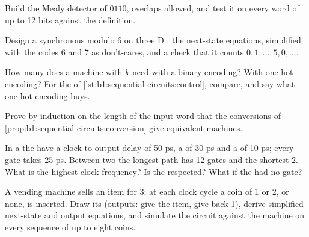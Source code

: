 \begin{exercise}[$\star\star$]\label{exo:b1:sequential-circuits:7}
Build the Mealy detector of $0110$, overlaps allowed, and test it on every word of up to 12 bits against the definition.
\end{exercise}

\begin{exercise}[$\star\star$]\label{exo:b1:sequential-circuits:8}
Design a synchronous  modulo 6 on three D : the next-state equations, simplified with the codes 6 and 7
as don't-cares, and a check that it counts $0, 1, \dots, 5, 0, \dots$.
\end{exercise}

\begin{exercise}[$\star\star$]\label{exo:b1:sequential-circuits:9}
How many  does a machine with $k$  need with a binary encoding? With one-hot encoding? For the  of \cref{lst:b1:sequential-circuits:control}, compare, and say what one-hot encoding buys.
\end{exercise}

\begin{exercise}[$\star\star\star$]\label{exo:b1:sequential-circuits:10}
Prove by induction on the length of the input word that the conversions of
\cref{prop:b1:sequential-circuits:conversion} give equivalent machines.
\end{exercise}

\begin{exercise}[$\star\star\star$]\label{exo:b1:sequential-circuits:11}
In a  the  have a clock-to-output delay of 50 ps, a  of 30 ps and a  of
10 ps; every gate takes 25 ps. Between two  the longest path has 12 gates and the shortest 2. What is the
highest clock frequency? Is the  respected? What if the  had no gate?
\end{exercise}

\begin{exercise}[$\star\star\star$]\label{exo:b1:sequential-circuits:12}
A vending machine sells an item for 3; at each clock cycle a coin of 1 or 2, or none, is inserted. Draw its  (outputs: give the item, give back 1), derive simplified next-state and output equations, and simulate the circuit
against the machine on every sequence of up to eight coins.
\end{exercise}

